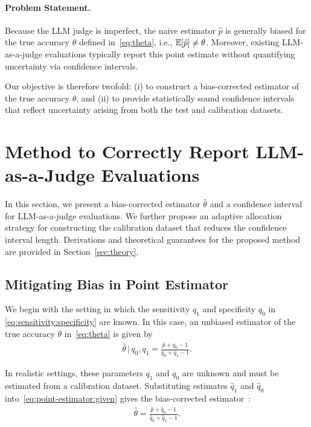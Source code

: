 \paragraph{Problem Statement.}
Because the LLM judge is imperfect, the naive estimator $\hat{p}$ is generally biased for the true accuracy $\theta$ defined in~\eqref{eq:theta}, i.e., $\displaystyle \mathbb{E}[\hat{p}] \neq \theta$. Moreover, existing LLM-as-a-judge evaluations typically report this point estimate without quantifying uncertainty via confidence intervals.

Our objective is therefore twofold:
(i) to construct a bias-corrected estimator of the true accuracy $\theta$, and
(ii) to provide statistically sound confidence intervals that reflect uncertainty arising from both the test and calibration datasets.




\section{Method to Correctly Report LLM-as-a-Judge Evaluations}\label{sec:method}

In this section, we present a bias-corrected estimator $\hat{\theta}$ and a confidence interval for LLM-as-a-judge evaluations. We further propose an adaptive allocation strategy for constructing the calibration dataset that reduces the confidence interval length. Derivations and theoretical guarantees for the proposed method are provided in Section~\ref{sec:theory}.

\subsection{Mitigating Bias in Point Estimator}

We begin with the setting in which the sensitivity $q_1$ and specificity $q_0$ in \eqref{eq:sensitivity:specificity} are known. In this case, an unbiased estimator of the true accuracy $\theta$ in~\eqref{eq:theta} is given by
\begin{align}
    \label{eq:point-estimator:given}
    \hat{\theta} \, \big| \, q_0, q_1 = \frac{\hat{p} + q_0 - 1}{q_0 + q_1 - 1}
    .
\end{align}

In realistic settings, these parameters $q_1$ and $q_0$ are unknown and must be estimated from a calibration dataset. Substituting estimates $\hat{q}_1$ and $\hat{q}_0$ into~\eqref{eq:point-estimator:given} gives the bias-corrected estimator~\citep{rogan1978estimating, lang2014confidence}:
\begin{align}
    \label{eq:point-estimator}
    \boxed{
    \hat{\theta} = \frac{\hat{p} + \hat{q}_0 - 1}{\hat{q}_0 + \hat{q}_1 - 1}
    }.
\end{align}

